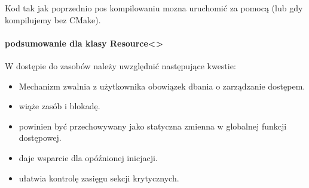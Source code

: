 Kod tak jak poprzednio pos kompilowaniu mozna uruchomić za pomocą  (lub  gdy kompilujemy bez CMake).

\paragraph{podsumowanie dla klasy Resource<>}
W dostępie do zasobów należy uwzględnić następujące kwestie:
\begin{itemize}
\item Mechanizm  zwalnia z użytkownika obowiązek dbania o zarządzanie dostępem.
\item {} wiąże zasób i blokadę.
\item {} powinien być przechowywany jako statyczna zmienna w globalnej funkcji dostępowej.
\item {} daje wsparcie dla opóźnionej inicjacji.
\item {} ułatwia kontrolę zasięgu sekcji krytycznych.
\end{itemize}
